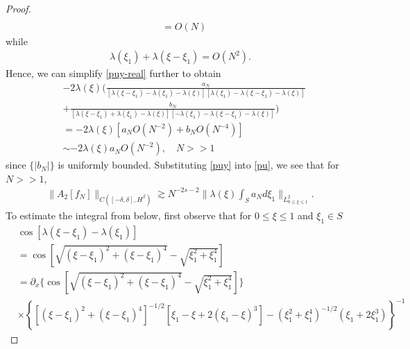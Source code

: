 \documentclass[12pt,reqno]{amsart}
\numberwithin{equation}{section}  %
\newcommand{\p}{\partial}
\begin{document}
\begin{proof}
\begin{equation*}
\begin{split}
 \\
 & = O(N)
\end{split}
\end{equation*}
%
%
while
%
%
\begin{equation*}
\begin{split}
  \lambda(\xi_{1}) + \lambda(\xi - \xi_{1}) = O(N^{2}).
\end{split}
\end{equation*}
Hence, we can simplify \eqref{puy-real} further to obtain
%
%
\begin{equation*}
\begin{split}
  & -2 \lambda(\xi) \bigg (  \frac{a_{N}}{[\lambda(\xi - \xi_{1}) - \lambda(\xi_{1}) - \lambda(\xi)][\lambda(\xi_{1}) - \lambda(\xi - \xi_{1}) - \lambda(\xi)]} 
  \\
  & +  \frac{b_{N}}{[\lambda(\xi - \xi_{1}) + \lambda(\xi_{1}) - \lambda(\xi)][-\lambda(\xi_{1}) - \lambda(\xi - \xi_{1}) - \lambda(\xi)]} 
   \bigg )
   \\
   & = -2 \lambda(\xi) \left [ a_{N} O(N^{-2}) + b_{N} O(N^{-4})  \right ]
   \\
   & \sim  -2 \lambda(\xi) a_{N} O(N^{-2}), \quad N > >1
\end{split}
\end{equation*}
%
since $\{|b_{N}|\}$ is uniformly bounded. Substituting \eqref{puy} into \eqref{pu}, we see that for $N > > 1$,  
%
%
\begin{equation*}
\begin{split}
\|A_{2}[f_{N}]\|_{C( [-\delta, \delta], H^{\beta})}
\gtrsim N^{-2 s -2} \|  \lambda(\xi) \int_{S}a_{N} d \xi_{1} \|_{L^{2}_{0 \le \xi \le 1}}.
\end{split}
\end{equation*}
%
%
To estimate the integral from below, first observe that for $0 \le \xi \le 1$ and $\xi_{1} \in S$
\begin{equation*}
\begin{split}
  & \cos[\lambda(\xi - \xi_{1}) - \lambda(\xi_{1})] 
  \\
  & = \cos\left[ \sqrt{(\xi - \xi_{1})^{2} + (\xi - \xi_{1})^{4}} - \sqrt{\xi_{1}^{2} + \xi_{1}^{4}} \right] 
  \\
  & = \p_{x} \{ \cos\left[ \sqrt{(\xi - \xi_{1})^{2} + (\xi - \xi_{1})^{4}} - \sqrt{\xi_{1}^{2} + \xi_{1}^{4}} \right] \} 
  \\
  & \times \left\{ [(\xi - \xi_{1})^{2} + (\xi - \xi_{1})^{4}]^{-1/2}[\xi_{1} - \xi + 2(\xi_{1} - \xi)^{3}] - (\xi_{1}^{2} + \xi_{1}^{4})^{-1/2} (\xi_{1} + 2 \xi_{1}^{3}) \right\}^{-1}

\end{split}
\end{equation*}
\end{proof}
\end{document}
